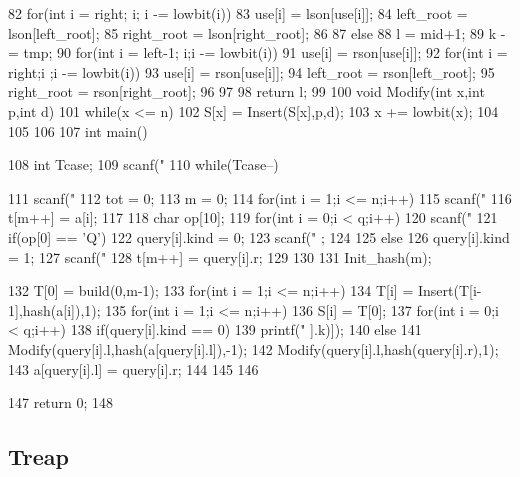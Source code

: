 \documentclass[11pt]{article}
\begin{document}
\begin{Code}
{{{ 82                  for(int i = right; i; i -= lowbit(i))
 83                      use[i] = lson[use[i]];
 84                  left_root = lson[left_root];
 85                  right_root = lson[right_root];
 86              }
 87              else{
 88                  l = mid+1;
 89                  k -= tmp;
 90                  for(int i = left-1; i;i -= lowbit(i))
 91                      use[i] = rson[use[i]];
 92                  for(int i = right;i ;i -= lowbit(i))
 93                      use[i] = rson[use[i]];
 94                  left_root = rson[left_root];
 95                  right_root = rson[right_root];
 96              }
 97       }
 98       return l;
 99   }
100   void Modify(int x,int p,int d){
101       while(x <= n){
102           S[x] = Insert(S[x],p,d);
103           x += lowbit(x);
104       }
105   }
106
107   int main(){
108       int Tcase;
109       scanf("%
110       while(Tcase--){
111           scanf("%
112           tot = 0;
113           m = 0;
114           for(int i = 1;i <= n;i++){
115               scanf("%
116               t[m++] = a[i];
117           }
118           char op[10];
119           for(int i = 0;i < q;i++){
120               scanf("%
121               if(op[0] == 'Q'){
122                    query[i].kind = 0;
123                    scanf("%
                          ;
124               }
125               else{
126                    query[i].kind = 1;
127                    scanf("%
128                    t[m++] = query[i].r;
129               }
130           }
131           Init_hash(m);


132              T[0] = build(0,m-1);
133              for(int i = 1;i <= n;i++)
134                  T[i] = Insert(T[i-1],hash(a[i]),1);
135              for(int i = 1;i <= n;i++)
136                  S[i] = T[0];
137              for(int i = 0;i < q;i++){
138                  if(query[i].kind == 0)
139                      printf("%
                            ].k)]);
140                  else{
141                      Modify(query[i].l,hash(a[query[i].l]),-1);
142                      Modify(query[i].l,hash(query[i].r),1);
143                      a[query[i].l] = query[i].r;
144                  }
145              }
146       }
147       return 0;
148 }
\end{Code}

\subsection{Treap}
\end{document}
